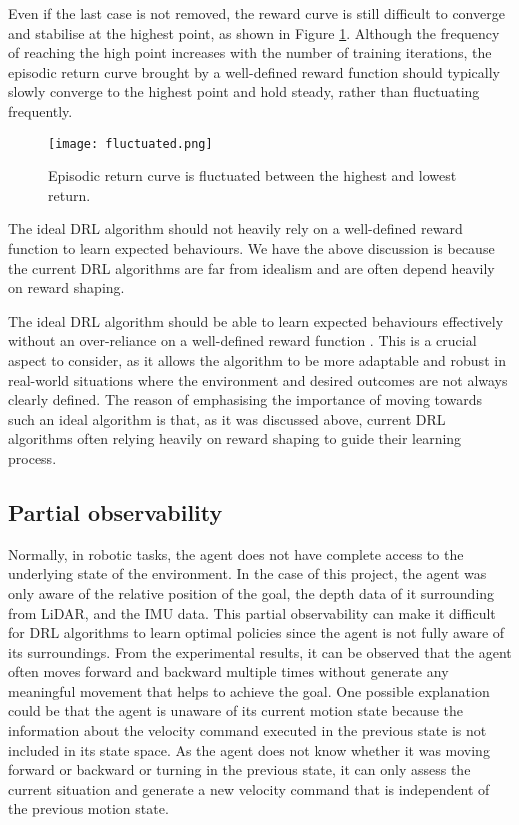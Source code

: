 Even if the last case is not removed, the reward curve is still difficult to converge and stabilise at the highest point, as shown in Figure \ref{fig:fluctuated}. Although the frequency of reaching the high point increases with the number of training iterations, the episodic return curve brought by a well-defined reward function should typically slowly converge to the highest point and hold steady, rather than fluctuating frequently.
\begin{figure}[htbp]
   \centering
   \texttt{[image: fluctuated.png]}
   \caption{Episodic return curve is fluctuated between the highest and lowest return.}
   \label{fig:fluctuated}
\end{figure}

The ideal DRL algorithm should not heavily rely on a well-defined reward function to learn expected behaviours. We have the above discussion is because the current DRL algorithms are far from idealism and are often depend heavily on reward shaping.

The ideal DRL algorithm should be able to learn expected behaviours effectively without an over-reliance on a well-defined reward function \cite{ref:drl-that-matters}. This is a crucial aspect to consider, as it allows the algorithm to be more adaptable and robust in real-world situations where the environment and desired outcomes are not always clearly defined. The reason of emphasising the importance of moving towards such an ideal algorithm is that, as it was discussed above, current DRL algorithms often relying heavily on reward shaping to guide their learning process.

\subsection{Partial observability}

Normally, in robotic tasks, the agent does not have complete access to the underlying state of the environment. In the case of this project, the agent was only aware of the relative position of the goal, the depth data of it surrounding from LiDAR, and the IMU data. This partial observability can make it difficult for DRL algorithms to learn optimal policies since the agent is not fully aware of its surroundings. From the experimental results, it can be observed that the agent often moves forward and backward multiple times without generate any meaningful movement that helps to achieve the goal. One possible explanation could be that the agent is unaware of its current motion state because the information about the velocity command executed in the previous state is not included in its state space. As the agent does not know whether it was moving forward or backward or turning in the previous state, it can only assess the current situation and generate a new velocity command that is independent of the previous motion state.

